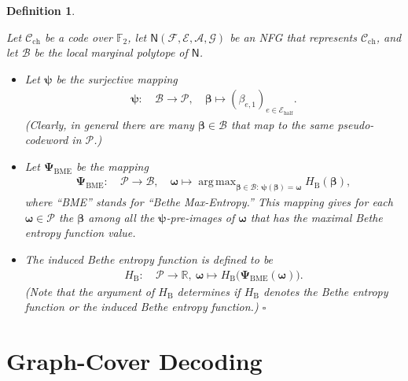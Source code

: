 \documentclass[journal, twocolumn]{IEEEtran}
\newcommand{\R}{\mathbb{R}}
\DeclareMathOperator*{\argmax}{arg\,max}
\newcommand{\code}[1]{\mathcal{#1}}
\newcommand{\set}[1]{\mathcal{#1}}
\newcommand{\graph}[1]{\mathsf{#1}}
\newcommand{\GF}[1]{\mathbb{F}_{#1}}
\newcommand{\codeCchannel}{\code{C}_{\mathrm{ch}}}
\newcommand{\bel}{\beta}
\newcommand{\vbel}{\boldsymbol{\bel}}
\newcommand{\setA}{\set{A}}
\newcommand{\setE}{\set{E}}
\newcommand{\setEhalf}{\set{E}_{\mathrm{half}}}
\newcommand{\setF}{\set{F}}
\newcommand{\setG}{\set{G}}
\newcommand{\vomega}{\boldsymbol{\omega}}
\newcommand{\fp}[1]{\mathcal{#1}}
\newcommand{\lmpB}{\mathcal{B}}
\newcommand{\graphN}{\graph{N}}
\newcommand{\HBethe}{H_{\mathrm{B}}}
\newcommand{\?}{\mathrm{?}}
\newcommand{\vPsiBME}{\boldsymbol{\Psi}_{\mathrm{BME}}}
\newcommand{\vpsi}{\boldsymbol{\psi}}
\newcommand{\qedwhite}{\hspace*{\fill}%
  $\square$\smallskip}
\newcommand{\defend}{\qedwhite}
\newtheorem{Definition}[Lemma]{Definition}
\begin{document}
\begin{Definition}
  \label{def:induced:bethe:entropy:function:1}

  Let $\codeCchannel$ be a code over $\GF{2}$, let $\graphN(\setF,\setE, \setA,
  \setG)$ be an NFG that represents $\codeCchannel$, and let $\lmpB$
  be the local marginal polytope of $\graphN$.
  \begin{itemize}

  \item Let $\vpsi$ be the surjective mapping
    \begin{align*}
      \vpsi: \ 
        &\lmpB \to     \fp{P}, \quad
         \vbel \mapsto (\bel_{e,1})_{e \in \setEhalf}.
    \end{align*}
    (Clearly, in general there are many $\vbel \in \lmpB$ that map to the same
    pseudo-codeword in $\fp{P}$.)

  \item Let $\vPsiBME$ be the mapping
    \begin{align}
      \vPsiBME: \
        &\fp{P}  \to     \lmpB, \quad
         \vomega \mapsto \argmax_{\vbel \in \lmpB: \, 
                                  \vpsi(\vbel) = \vomega}
                           \HBethe(\vbel),
                                     \label{eq:vPsiBME:def:1}
    \end{align}
    where ``BME'' stands for ``Bethe Max-Entropy.'' This mapping gives for
    each $\vomega \in \fp{P}$ the $\vbel$ among all the $\vpsi$-pre-images of
    $\vomega$ that has the maximal Bethe entropy function value.

  \item The induced Bethe entropy function is defined to be
    \begin{align*}
      \HBethe: \ 
        &\fp{P}  \to     \R, \ 
         \vomega \mapsto \HBethe
             \big(
               \vPsiBME(\vomega)
             \big).
    \end{align*}
    (Note that the argument of $\HBethe$ determines if $\HBethe$ denotes the
    Bethe entropy function or the induced Bethe entropy function.) \defend

  \end{itemize}
\end{Definition}



\section{Graph-Cover Decoding}
\label{sec:graph:cover:decoding:1}
\end{document}
